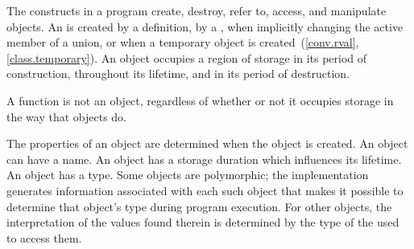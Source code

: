 \pnum
{}%
The constructs in a \Cpp{} program create, destroy, refer to, access, and
manipulate objects.
An  is created
by a definition,
by a ,
when implicitly changing the active member of a union,
or
when a temporary object is created~(\ref{conv.rval}, \ref{class.temporary}).
An object occupies a region of storage
in its period of construction,
throughout its lifetime,
and
in its period of destruction.
\begin{note} A function is not an object, regardless of whether or not it
occupies storage in the way that objects do. \end{note}
The properties of an
object are determined when the object is created. An object can have a
name. An object has a storage
duration which influences its
lifetime. An object has a
type.
Some objects are
polymorphic; the implementation
generates information associated with each such object that makes it
possible to determine that object's type during program execution. For
other objects, the interpretation of the values found therein is
determined by the type of the 
used to access them.

